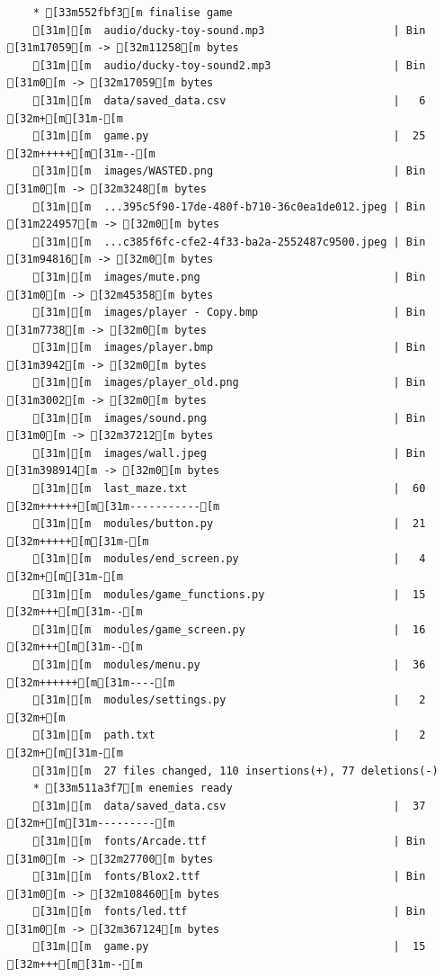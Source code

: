 \documentclass{article}
\begin{document}
{\begin{verbatim}
    * [33m552fbf3[m finalise game
    [31m|[m  audio/ducky-toy-sound.mp3                    | Bin [31m17059[m -> [32m11258[m bytes
    [31m|[m  audio/ducky-toy-sound2.mp3                   | Bin [31m0[m -> [32m17059[m bytes
    [31m|[m  data/saved_data.csv                          |   6 [32m+[m[31m-[m
    [31m|[m  game.py                                      |  25 [32m+++++[m[31m--[m
    [31m|[m  images/WASTED.png                            | Bin [31m0[m -> [32m3248[m bytes
    [31m|[m  ...395c5f90-17de-480f-b710-36c0ea1de012.jpeg | Bin [31m224957[m -> [32m0[m bytes
    [31m|[m  ...c385f6fc-cfe2-4f33-ba2a-2552487c9500.jpeg | Bin [31m94816[m -> [32m0[m bytes
    [31m|[m  images/mute.png                              | Bin [31m0[m -> [32m45358[m bytes
    [31m|[m  images/player - Copy.bmp                     | Bin [31m7738[m -> [32m0[m bytes
    [31m|[m  images/player.bmp                            | Bin [31m3942[m -> [32m0[m bytes
    [31m|[m  images/player_old.png                        | Bin [31m3002[m -> [32m0[m bytes
    [31m|[m  images/sound.png                             | Bin [31m0[m -> [32m37212[m bytes
    [31m|[m  images/wall.jpeg                             | Bin [31m398914[m -> [32m0[m bytes
    [31m|[m  last_maze.txt                                |  60 [32m++++++[m[31m-----------[m
    [31m|[m  modules/button.py                            |  21 [32m+++++[m[31m-[m
    [31m|[m  modules/end_screen.py                        |   4 [32m+[m[31m-[m
    [31m|[m  modules/game_functions.py                    |  15 [32m+++[m[31m--[m
    [31m|[m  modules/game_screen.py                       |  16 [32m+++[m[31m--[m
    [31m|[m  modules/menu.py                              |  36 [32m++++++[m[31m----[m
    [31m|[m  modules/settings.py                          |   2 [32m+[m
    [31m|[m  path.txt                                     |   2 [32m+[m[31m-[m
    [31m|[m  27 files changed, 110 insertions(+), 77 deletions(-)
    * [33m511a3f7[m enemies ready
    [31m|[m  data/saved_data.csv                          |  37 [32m+[m[31m---------[m
    [31m|[m  fonts/Arcade.ttf                             | Bin [31m0[m -> [32m27700[m bytes
    [31m|[m  fonts/Blox2.ttf                              | Bin [31m0[m -> [32m108460[m bytes
    [31m|[m  fonts/led.ttf                                | Bin [31m0[m -> [32m367124[m bytes
    [31m|[m  game.py                                      |  15 [32m+++[m[31m--[m

\end{verbatim}}
\end{document}
